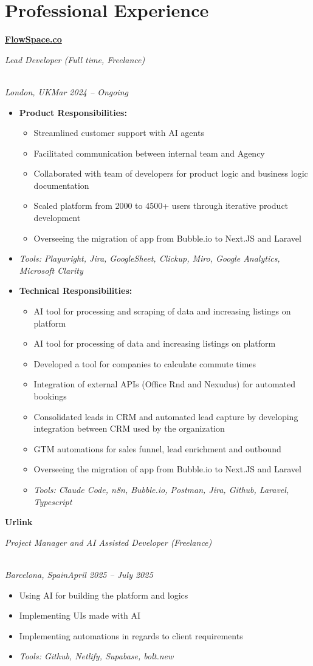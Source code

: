 \documentclass[a4paper,10pt]{article}
\newcommand{\role}[4]{\vspace{3pt}\noindent\hspace{0.6em}\parbox[t]{0.38\textwidth}{\raggedright\textbf{#1}}\hfill\parbox[t]{0.58\textwidth}{\raggedleft\textit{#2}}\\{\textit{#3}\hfill\textit{#4}}\vspace{1pt}}
\begin{document}
\section{Professional Experience}
\role{\href{https://flowspace.co}{FlowSpace.co}}{Lead Developer (Full time, Freelance)}{London, UK}{Mar 2024 -- Ongoing}
\begin{itemize}
\item \textbf{Product Responsibilities:}
\begin{itemize}[label=--]
\item Streamlined customer support with AI agents
\item Facilitated communication between internal team and Agency
\item Collaborated with team of developers for product logic and business logic documentation
\item Scaled platform from 2000 to 4500+ users through iterative product development
\item Overseeing the migration of app from Bubble.io to Next.JS and Laravel
\end{itemize}
\item \textit{Tools: Playwright, Jira, GoogleSheet, Clickup, Miro, Google Analytics, Microsoft Clarity}
\item \textbf{Technical Responsibilities:}
\begin{itemize}[label=--]
\item AI tool for processing and scraping of data and increasing listings on platform
\item AI tool for processing of data and increasing listings on platform
\item Developed a tool for companies to calculate commute times
\item Integration of external APIs (Office Rnd and Nexudus) for automated bookings
\item Consolidated leads in CRM and automated lead capture by developing integration between CRM used by the organization
\item GTM automations for sales funnel, lead enrichment and outbound
\item Overseeing the migration of app from Bubble.io to Next.JS and Laravel
\item \textit{Tools: Claude Code, n8n, Bubble.io, Postman, Jira, Github, Laravel, Typescript}
\end{itemize}
\end{itemize}

\role{Urlink}{Project Manager and AI Assisted Developer (Freelance)}{Barcelona, Spain}{April 2025 -- July 2025}
\begin{itemize}
\item Using AI for building the platform and logics
\item Implementing UIs made with AI
\item Implementing automations in regards to client requirements
\item \textit{Tools: Github, Netlify, Supabase, bolt.new}
\end{itemize}
\end{document}
